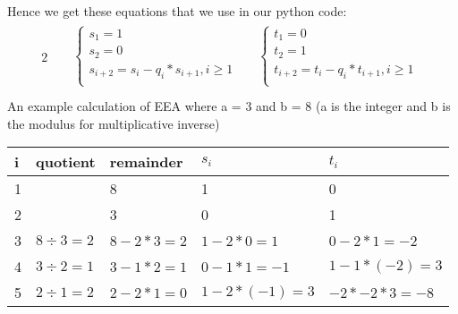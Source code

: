 \documentclass[12pt]{article}
\begin{document}
Hence we get these equations that we use in our python code:
\begin{alignat*}{2}
    & \begin{aligned} & \begin{cases}
    s_1 = 1\\
    s_2 = 0\\
    s_{i+2} = s_i-q_i*s_{i+1}, i \geq 1 \\
  \end{cases}\\
  \end{aligned}
  \begin{aligned}
  & \begin{cases}
    t_1 = 0\\
    t_2 = 1\\
    t_{i+2} = t_i-q_i*t_{i+1}, i \geq 1 \\
  \end{cases} \\
  \end{aligned}
\end{alignat*}
\newpage
An example calculation of EEA where a = 3 and b = 8 (a is the integer and b is the modulus for multiplicative inverse)
\begin{table}[ht]
\begin{tabular}{|l|l|l|l|l|}
\hline
i & quotient     & remainder       &  \(s_i\)               & \(t_i\)               \\ \hline
1  &              & 8               & 1                  & 0                  \\ \hline
2  &              & 3               & 0                  & 1                  \\ \hline
3  & \(8 \div 3 = 2\) & \(8 - 2 * 3 = 2\) & \(1 - 2 * 0 = 1\)    & \(0 - 2 * 1 = -2\)   \\ \hline
4  & \(3 \div 2 = 1\) & \(3 - 1 * 2 = 1\) & \(0 - 1 * 1 = -1\)   & \(1 - 1 * (-2) = 3\) \\ \hline
5  & \(2 \div 1 = 2\) & \(2 - 2 * 1 = 0\) & \(1 - 2 * (-1) = 3\) & \(-2 * -2 * 3 = -8\) \\ \hline
\end{tabular}
\end{table}
%
%
%
\end{document}
